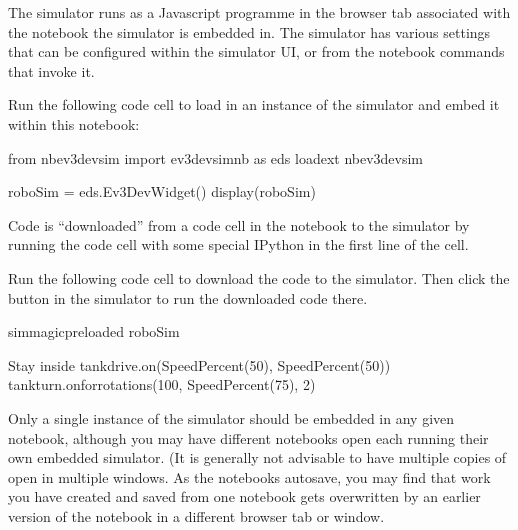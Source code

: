 \documentclass[letterpaper,10pt,english]{sphinxmanual}
\begin{document}
The simulator runs as a Javascript programme in the browser tab associated with the notebook the simulator is embedded in. The simulator has various settings that can be configured within the simulator UI, or from the notebook commands that invoke it.


Run the following code cell to load in an instance of the simulator and embed it within this notebook:

{
\begin{sphinxVerbatim}[commandchars=\\\{\}]
\llap{\color{nbsphinxin}[ ]:\,\hspace{\fboxrule}\hspace{\fboxsep}}from nbev3devsim import ev3devsim\PYGZus{}nb as eds
\PYGZpc{}load\PYGZus{}ext nbev3devsim

roboSim = eds.Ev3DevWidget()
display(roboSim)
\end{sphinxVerbatim}
}

Code is “downloaded” from a code cell in the notebook to the simulator by running the code cell with some special IPython  in the first line of the cell.

Run the following code cell to download the code to the simulator. Then click the  button in the simulator to run the downloaded code there.

{
\begin{sphinxVerbatim}[commandchars=\\\{\}]
\llap{\color{nbsphinxin}[ ]:\,\hspace{\fboxrule}\hspace{\fboxsep}}\PYGZpc{}\PYGZpc{}sim\PYGZus{}magic\PYGZus{}preloaded roboSim

\PYGZsh{} Stay inside
tank\PYGZus{}drive.on(SpeedPercent(50), SpeedPercent(50))
tank\PYGZus{}turn.on\PYGZus{}for\PYGZus{}rotations(\PYGZhy{}100, SpeedPercent(75), 2)
\end{sphinxVerbatim}
}

Only a single instance of the simulator should be embedded in any given notebook, although you may have different notebooks open each running their own embedded simulator. (It is generally not advisable to have multiple copies of  open in multiple windows. As the notebooks autosave, you may find that work you have created and saved from one notebook gets overwritten by an earlier version of the notebook in a different browser tab or window.
\end{document}
